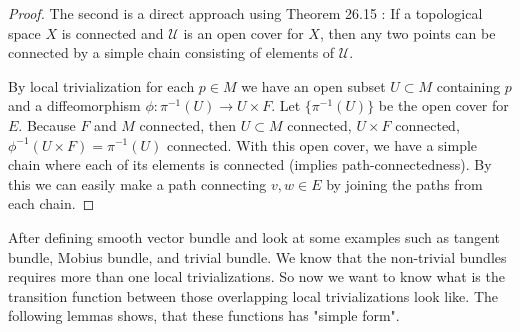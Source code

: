\documentclass[a4paper]{article}
\theoremstyle{remark}
\begin{document}
\begin{proof}
The second is a direct approach using Theorem 26.15 \cite{Willard}  : If a topological space $X$ is connected and $\mathcal{U}$ is an open cover for $X$, then any two points can be connected by a simple chain consisting of elements of $\mathcal{U}$.

By local trivialization for each $p \in M$ we have an open subset $U \subset M$ containing $p$ and a diffeomorphism $\phi : \pi^{-1}(U) \rightarrow U \times F$. Let $\{\pi^{-1}(U)\}$ be the open cover for $E$. Because $F$ and $M$ connected, then  $U\subset M$ connected, $U \times F$ connected, $\phi^{-1}(U\times F) = \pi^{-1}(U)$ connected. With this open cover, we have a simple chain where each of its elements is connected (implies path-connectedness). By this we can easily make a path connecting $v,w \in E$ by joining the paths from each chain.
\end{proof}

After defining smooth vector bundle and look at some examples such as tangent bundle, Mobius bundle, and trivial bundle. We know that the non-trivial bundles requires more than one local trivializations. So now we want to know what is the transition function between those overlapping local trivializations look like. The following lemmas shows, that these functions has "simple form".
\end{document}
